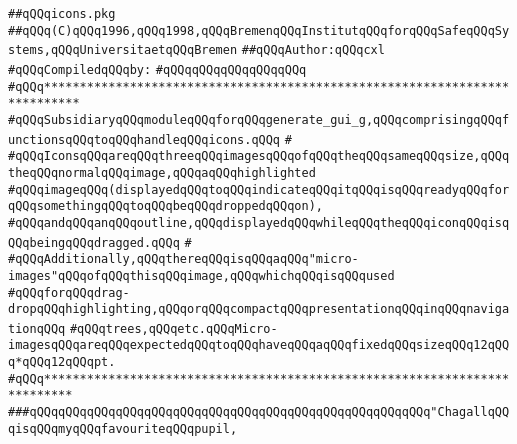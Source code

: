 \label{src/lib/tk/src/toolkit/icons.pkg}
\verb|##qQQqicons.pkg|\newline
\verb|##qQQq(C)qQQq1996,qQQq1998,qQQqBremenqQQqInstitutqQQqforqQQqSafeqQQqSystems,qQQqUniversitaetqQQqBremen|\newline
\verb|##qQQqAuthor:qQQqcxl|\newline
\newline
\verb|#qQQqCompiledqQQqby:|\newline
\verb|#qQQqqQQqqQQqqQQqqQQq|\newline
\newline
\newline
\newline
\verb|#qQQq***************************************************************************|\newline
\verb|#qQQqSubsidiaryqQQqmoduleqQQqforqQQqgenerate_gui_g,qQQqcomprisingqQQqfunctionsqQQqtoqQQqhandleqQQqicons.qQQq|\newline
\verb|#|\newline
\verb|#qQQqIconsqQQqareqQQqthreeqQQqimagesqQQqofqQQqtheqQQqsameqQQqsize,qQQqtheqQQqnormalqQQqimage,qQQqaqQQqhighlighted|\newline
\verb|#qQQqimageqQQq(displayedqQQqtoqQQqindicateqQQqitqQQqisqQQqreadyqQQqforqQQqsomethingqQQqtoqQQqbeqQQqdroppedqQQqon),|\newline
\verb|#qQQqandqQQqanqQQqoutline,qQQqdisplayedqQQqwhileqQQqtheqQQqiconqQQqisqQQqbeingqQQqdragged.qQQq|\newline
\verb|#|\newline
\verb|#qQQqAdditionally,qQQqthereqQQqisqQQqaqQQq"micro-images"qQQqofqQQqthisqQQqimage,qQQqwhichqQQqisqQQqused|\newline
\verb|#qQQqforqQQqdrag-dropqQQqhighlighting,qQQqorqQQqcompactqQQqpresentationqQQqinqQQqnavigationqQQq|\newline
\verb|#qQQqtrees,qQQqetc.qQQqMicro-imagesqQQqareqQQqexpectedqQQqtoqQQqhaveqQQqaqQQqfixedqQQqsizeqQQq12qQQq*qQQq12qQQqpt.|\newline
\verb|#qQQq**************************************************************************|\newline
\newline
\newline
\newline
\verb|###qQQqqQQqqQQqqQQqqQQqqQQqqQQqqQQqqQQqqQQqqQQqqQQqqQQqqQQq"ChagallqQQqisqQQqmyqQQqfavouriteqQQqpupil,|\newline
